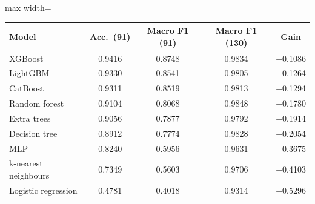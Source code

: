 \begin{adjustbox}{max width=\linewidth}
\begin{tabular}{lcccc}
\toprule
Model & Acc.\ (91) & Macro F1 (91) & Macro F1 (130) & Gain \\
\midrule
XGBoost & 0.9416 & 0.8748 & 0.9834 & +0.1086 \\
LightGBM & 0.9330 & 0.8541 & 0.9805 & +0.1264 \\
CatBoost & 0.9311 & 0.8519 & 0.9813 & +0.1294 \\
Random forest & 0.9104 & 0.8068 & 0.9848 & +0.1780 \\
Extra trees & 0.9056 & 0.7877 & 0.9792 & +0.1914 \\
Decision tree & 0.8912 & 0.7774 & 0.9828 & +0.2054 \\
MLP & 0.8240 & 0.5956 & 0.9631 & +0.3675 \\
k-nearest neighbours & 0.7349 & 0.5603 & 0.9706 & +0.4103 \\
Logistic regression & 0.4781 & 0.4018 & 0.9314 & +0.5296 \\
\bottomrule
\end{tabular}
\end{adjustbox}
